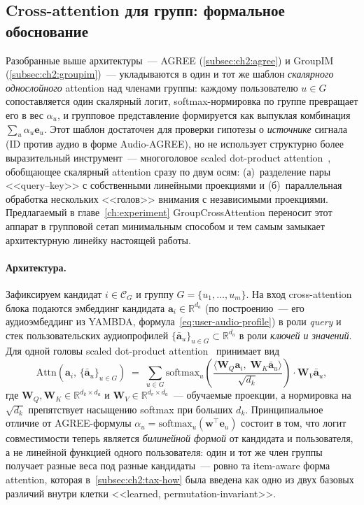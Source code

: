 \subsection{Cross-attention для групп: формальное обоснование}
\label{subsec:ch2:cross-attn}

Разобранные выше архитектуры~--- AGREE (\ref{subsec:ch2:agree}) и GroupIM (\ref{subsec:ch2:groupim})~--- укладываются в один и тот же шаблон \emph{скалярного однослойного} attention над членами группы: каждому пользователю $u \in G$ сопоставляется один скалярный логит, softmax-нормировка по группе превращает его в вес $\alpha_u$, и групповое представление формируется как выпуклая комбинация $\sum_u \alpha_u \mathbf{e}_u$. Этот шаблон достаточен для проверки гипотезы о \emph{источнике} сигнала (ID против аудио в форме Audio-AGREE), но не использует структурно более выразительный инструмент~--- многоголовое scaled dot-product attention~\cite{vaswani2017attention}, обобщающее скалярный attention сразу по двум осям: (а)~разделение пары <<query--key>> с собственными линейными проекциями и (б)~параллельная обработка нескольких <<голов>> внимания с независимыми проекциями. Предлагаемый в главе~\ref{ch:experiment} GroupCrossAttention переносит этот аппарат в групповой сетап минимальным способом и тем самым замыкает архитектурную линейку настоящей работы.

\paragraph{Архитектура.} Зафиксируем кандидат $i \in \mathcal{C}_G$ и группу $G = \{u_1, \ldots, u_m\}$. На вход cross-attention блока подаются эмбеддинг кандидата $\mathbf{a}_i \in \mathbb{R}^{d_a}$ (по построению~--- его аудиоэмбеддинг из YAMBDA, формула~\eqref{eq:user-audio-profile}) в роли \emph{query} и стек пользовательских аудиопрофилей $\{\bar{\mathbf{a}}_u\}_{u \in G} \subset \mathbb{R}^{d_a}$ в роли \emph{ключей и значений}. Для одной головы scaled dot-product attention~\cite{vaswani2017attention} принимает вид
\begin{equation}
    \mathrm{Attn}\!\left(\mathbf{a}_i,\, \{\bar{\mathbf{a}}_u\}_{u \in G}\right)
    \;=\;
    \sum_{u \in G}
    \mathrm{softmax}_{u}\!\left(
        \frac{ \langle \mathbf{W}_Q \mathbf{a}_i,\; \mathbf{W}_K \bar{\mathbf{a}}_u \rangle }{ \sqrt{d_k} }
    \right)
    \cdot \mathbf{W}_V \bar{\mathbf{a}}_u,
    \label{eq:ch2:cross-attn}
\end{equation}
где $\mathbf{W}_Q, \mathbf{W}_K \in \mathbb{R}^{d_k \times d_a}$ и $\mathbf{W}_V \in \mathbb{R}^{d_v \times d_a}$~--- обучаемые проекции, а нормировка на $\sqrt{d_k}$ препятствует насыщению softmax при больших $d_k$. Принципиальное отличие от AGREE-формулы $\alpha_u = \mathrm{softmax}_u(\mathbf{w}^\top \mathbf{e}_u)$ состоит в том, что логит совместимости теперь является \emph{билинейной формой} от кандидата и пользователя, а не линейной функцией одного пользователя: один и тот же член группы получает разные веса под разные кандидаты~--- ровно та item-aware форма attention, которая в~\ref{subsec:ch2:tax-how} была введена как одно из двух базовых различий внутри клетки <<learned, permutation-invariant>>.

